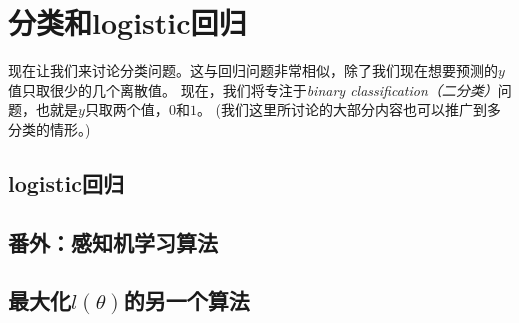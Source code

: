 \section{分类和logistic回归}

现在让我们来讨论分类问题。这与回归问题非常相似，除了我们现在想要预测的$y$值只取很少的几个离散值。
现在，我们将专注于\emph{binary classification（二分类）}问题，也就是$y$只取两个值，$0$和$1$。
(我们这里所讨论的大部分内容也可以推广到多分类的情形。)

\subsection{logistic回归}

\subsection{番外：感知机学习算法}

\subsection{最大化$l(\theta)$的另一个算法}

